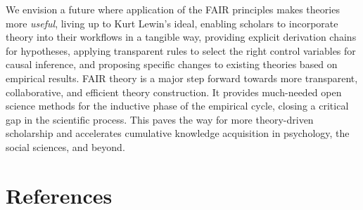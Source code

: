 \documentclass[man]{apa7}
\begin{document}
We envision a future where application of the FAIR principles makes theories more \emph{useful},
living up to Kurt Lewin's ideal,
enabling scholars to incorporate theory into their workflows in a tangible way,
providing explicit derivation chains for hypotheses,
applying transparent rules to select the right control variables for causal inference,
and proposing specific changes to existing theories based on empirical results.
FAIR theory is a major step forward towards more transparent, collaborative, and efficient theory construction.
It provides much-needed open science methods for the inductive phase of the empirical cycle,
closing a critical gap in the scientific process.
This paves the way for more theory-driven scholarship
and accelerates cumulative knowledge acquisition in psychology, the social sciences, and beyond.

\newpage

\section{References}\label{references}
\end{document}
